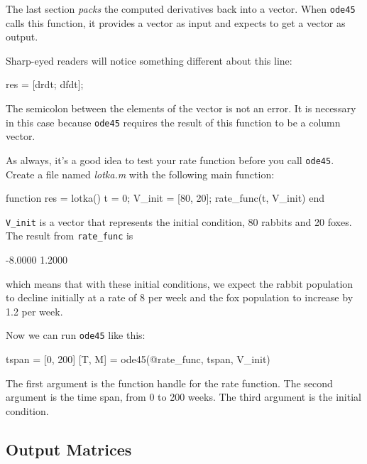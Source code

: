 The last section \emph{packs} the computed derivatives back into a
vector.  When \lstinline{ode45} calls this function, it provides a vector
as input and expects to get a vector as output.

Sharp-eyed readers will notice something different about this line:

\begin{code}
    res = [drdt; dfdt];
\end{code}

The semicolon between the elements of the vector is not an error.  It
is necessary in this case because \lstinline{ode45} requires the result of
this function to be a column vector.


As always, it's a good idea to test your rate function before you call \lstinline{ode45}.
Create a file named \emph{lotka.m} with the following main function:

\begin{code}
function res = lotka()
    t = 0;
    V_init = [80, 20];
    rate_func(t, V_init)
end
\end{code}


\lstinline{V_init} is a vector that represents the initial condition, 80 rabbits and 20 foxes.
The result from \lstinline{rate_func} is

\begin{code}
-8.0000
 1.2000
 \end{code}
which means that with these initial conditions, we expect the rabbit population to decline initially at a rate of 8 per week and the fox population to increase by 1.2 per week.

Now we can run \lstinline{ode45} like this:

\begin{code}
tspan = [0, 200]
[T, M] = ode45(@rate_func, tspan, V_init)
\end{code}

The first argument is the function handle for the rate function.
The second argument is the time span, from 0 to 200 weeks.
The third argument is the initial condition.



\subsection{Output Matrices}

